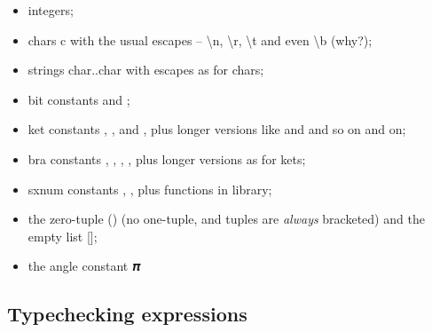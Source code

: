 \begin{itemize}
\item integers;
\item chars c with the usual escapes -- \textbackslash{n}, \textbackslash{r}, \textbackslash{t} and even \textbackslash{b} (why?);
\item strings char..char with escapes as for chars;
\item bit constants  and ;
\item ket constants \zero, \one, \plus{} and \minus, plus longer versions like  and \bv{+-+} and so on and on;
\item bra constants , , \vb{+}, \vb{-}, plus longer versions as for kets; 
\item sxnum constants , , plus functions in library;
\item the zero-tuple () (no one-tuple, and tuples are \emph{always} bracketed) and the empty list [];
\item the angle constant 𝝅
\end{itemize}

\subsection{Typechecking expressions}

